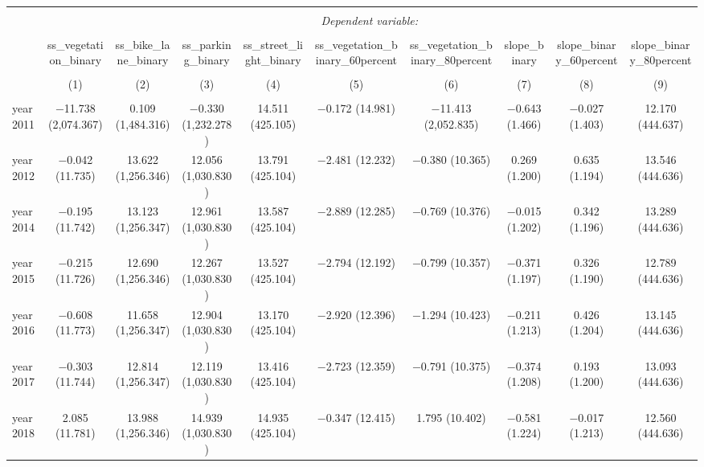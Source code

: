 
\begin{table}[!htbp] \centering 
  \caption{} 
  \label{} 
\small 
\begin{tabular}{@{\extracolsep{1pt}}lccccccccc} 
\\[-1.8ex]\hline 
\hline \\[-1.8ex] 
 & \multicolumn{9}{c}{\textit{Dependent variable:}} \\ 
\cline{2-10} 
\\[-1.8ex] & ss\_vegetation\_binary & ss\_bike\_lane\_binary & ss\_parking\_binary & ss\_street\_light\_binary & ss\_vegetation\_binary\_60percent & ss\_vegetation\_binary\_80percent & slope\_binary & slope\_binary\_60percent & slope\_binary\_80percent \\ 
\\[-1.8ex] & (1) & (2) & (3) & (4) & (5) & (6) & (7) & (8) & (9)\\ 
\hline \\[-1.8ex] 
 year2011 & $-$11.738 (2,074.367) & 0.109 (1,484.316) & $-$0.330 (1,232.278) & 14.511 (425.105) & $-$0.172 (14.981) & $-$11.413 (2,052.835) & $-$0.643 (1.466) & $-$0.027 (1.403) & 12.170 (444.637) \\ 
  year2012 & $-$0.042 (11.735) & 13.622 (1,256.346) & 12.056 (1,030.830) & 13.791 (425.104) & $-$2.481 (12.232) & $-$0.380 (10.365) & 0.269 (1.200) & 0.635 (1.194) & 13.546 (444.636) \\ 
  year2014 & $-$0.195 (11.742) & 13.123 (1,256.347) & 12.961 (1,030.830) & 13.587 (425.104) & $-$2.889 (12.285) & $-$0.769 (10.376) & $-$0.015 (1.202) & 0.342 (1.196) & 13.289 (444.636) \\ 
  year2015 & $-$0.215 (11.726) & 12.690 (1,256.346) & 12.267 (1,030.830) & 13.527 (425.104) & $-$2.794 (12.192) & $-$0.799 (10.357) & $-$0.371 (1.197) & 0.326 (1.190) & 12.789 (444.636) \\ 
  year2016 & $-$0.608 (11.773) & 11.658 (1,256.347) & 12.904 (1,030.830) & 13.170 (425.104) & $-$2.920 (12.396) & $-$1.294 (10.423) & $-$0.211 (1.213) & 0.426 (1.204) & 13.145 (444.636) \\ 
  year2017 & $-$0.303 (11.744) & 12.814 (1,256.347) & 12.119 (1,030.830) & 13.416 (425.104) & $-$2.723 (12.359) & $-$0.791 (10.375) & $-$0.374 (1.208) & 0.193 (1.200) & 13.093 (444.636) \\ 
  year2018 & 2.085 (11.781) & 13.988 (1,256.346) & 14.939 (1,030.830) & 14.935 (425.104) & $-$0.347 (12.415) & 1.795 (10.402) & $-$0.581 (1.224) & $-$0.017 (1.213) & 12.560 (444.636) \\ 

\end{tabular}
\end{table}
